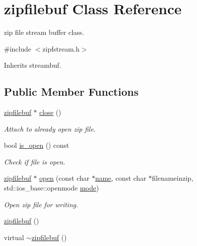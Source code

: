 \hypertarget{classzipfilebuf}{}\section{zipfilebuf Class Reference}
\label{classzipfilebuf}


zip file stream buffer class.  




{\ttfamily \#include $<$zipfstream.\+h$>$}



Inherits streambuf.

\subsection*{Public Member Functions}
\begin{DoxyCompactItemize}
\item 
\hyperlink{classzipfilebuf}{zipfilebuf} $\ast$ \hyperlink{classzipfilebuf_af9c0ac8b4fef88831bf6f76a7ae35952}{close} ()
\begin{DoxyCompactList}\small\item\em Attach to already open zip file. \end{DoxyCompactList}\item 
bool \hyperlink{classzipfilebuf_a7563b8596d1b48825f1cb097a3859972}{is\+\_\+open} () const
\begin{DoxyCompactList}\small\item\em Check if file is open. \end{DoxyCompactList}\item 
\hyperlink{classzipfilebuf}{zipfilebuf} $\ast$ \hyperlink{classzipfilebuf_a92684f54693ebbc9eff315fe0e9350ad}{open} (const char $\ast$\hyperlink{lp__lib_8h_a2946c588fc7fa2fa5b43ac54b7872725}{name}, const char $\ast$filenameinzip, std\+::ios\+\_\+base\+::openmode \hyperlink{ioapi_8h_ab77191763734fbb3e515371393ccb606}{mode})
\begin{DoxyCompactList}\small\item\em Open zip file for writing. \end{DoxyCompactList}\item 
\hyperlink{classzipfilebuf_a9d57ce4c64f37bfe40ec169a0569d010}{zipfilebuf} ()
\item 
virtual \hyperlink{classzipfilebuf_a3b54e3912c0d1a9df244ee1cf4567a78}{$\sim$zipfilebuf} ()
\end{DoxyCompactItemize}
